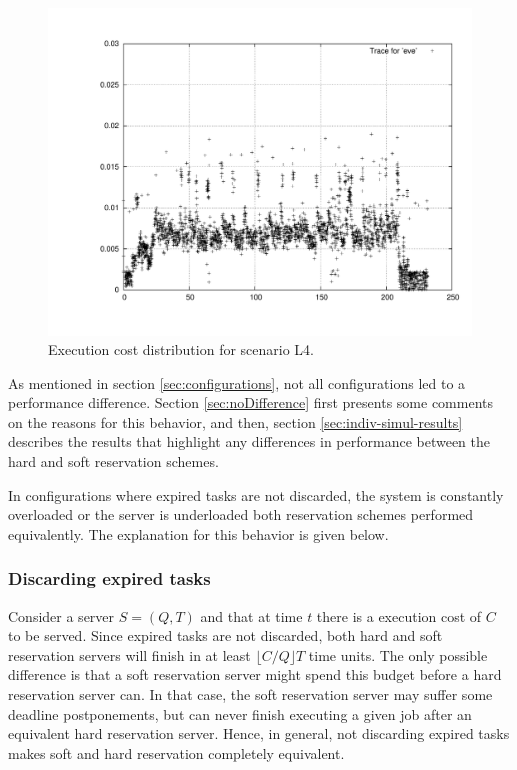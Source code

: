 \documentclass[times, 10pt,twocolumn]{article}
\begin{document}
\begin{figure}[h!t]
  \centering
  \includegraphics[scale=0.31]{trace-eve}
  \caption{Execution cost distribution for scenario L4.}
  \label{fig:plotl4}
\end{figure}

\label{sec:simulation-results}

As mentioned in section \ref{sec:configurations}, not all
configurations led to a performance difference. Section
\ref{sec:noDifference} first presents some comments on the reasons for
this behavior, and then, section \ref{sec:indiv-simul-results}
describes the results that highlight any differences in performance
between the hard and soft reservation schemes.

\label{sec:noDifference}

In configurations where expired tasks are not discarded, the system is
constantly overloaded or the server is underloaded both
reservation schemes performed equivalently. The explanation for this
behavior is given below.

\subsubsection{Discarding expired tasks}
\label{sec:disc-expir-tasks}

Consider a server $S = (Q,T)$ and that at time $t$ there is a
execution cost of $C$ to be served.  Since expired tasks are not
discarded, both hard and soft reservation servers will finish in at
least $\lfloor C/Q \rfloor T$ time units.  The only possible
difference is that a soft reservation server might spend this budget
before a hard reservation server can. In that case, the soft
reservation server may suffer some deadline postponements, but can
never finish executing a given job after an equivalent hard
reservation server. Hence, in general, not discarding expired tasks
makes soft and hard reservation completely equivalent.
\end{document}

